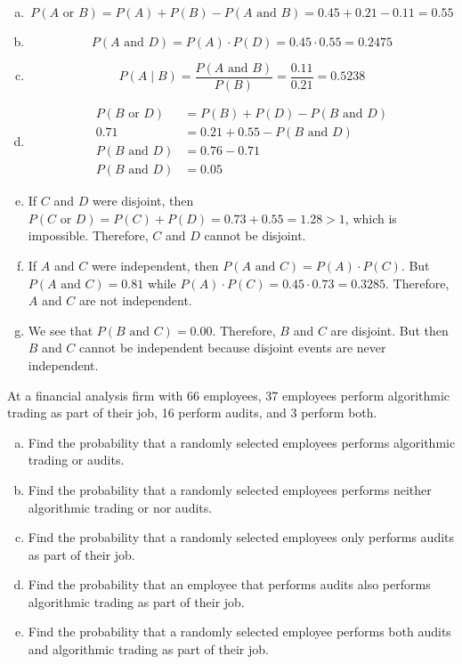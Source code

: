 \documentclass[11pt,letterpaper]{article}
\begin{document}
\sol
\begin{enumerate}[(a)]
\item 
	\[
	P(A \text{ or }B)= P(A) + P(B) - P(A \text{ and }B)= 0.45 + 0.21 - 0.11= 0.55
	\]

\item 
	\[
	P(A \text{ and }D)= P(A) \cdot P(D)= 0.45 \cdot 0.55= 0.2475
	\]

\item 
	\[
	P(A \;|\; B)= \dfrac{P(A \text{ and }B)}{P(B)}= \dfrac{0.11}{0.21}= 0.5238
	\]

\item 
	\[
	\begin{aligned}
	P(B \text{ or }D)&= P(B) + P(D) - P(B \text{ and }D) \\
	0.71&= 0.21 + 0.55 - P(B \text{ and }D) \\
	P(B \text{ and }D)&= 0.76 - 0.71 \\
	P(B \text{ and }D)&= 0.05
	\end{aligned}
	\]

\item If $C$ and $D$ were disjoint, then $P(C \text{ or }D)= P(C) + P(D)= 0.73 + 0.55= 1.28 > 1$, which is impossible. Therefore, $C$ and $D$ cannot be disjoint. 

\item If $A$ and $C$ were independent, then $P(A \text{ and }C)= P(A) \cdot P(C)$. But $P(A \text{ and }C)= 0.81$ while $P(A) \cdot P(C)= 0.45 \cdot 0.73= 0.3285$. Therefore, $A$ and $C$ are not independent. 

\item We see that $P(B \text{ and }C)= 0.00$. Therefore, $B$ and $C$ are disjoint. But then $B$ and $C$ cannot be independent because disjoint events are never independent. 
\end{enumerate}





\newpage





 At a financial analysis firm with 66 employees, 37 employees perform algorithmic trading as part of their job, 16 perform audits, and 3 perform both. 
        \begin{enumerate}[(a)]
        \item Find the probability that a randomly selected employees performs algorithmic trading or audits. 
        \item Find the probability that a randomly selected employees performs neither algorithmic trading or nor audits. 
        \item Find the probability that a randomly selected employees only performs audits as part of their job.
        \item Find the probability that an employee that performs audits also performs algorithmic trading as part of their job. 
        \item Find the probability that a randomly selected employee performs both audits and algorithmic trading as part of their job. 
        \end{enumerate} \pspace
\end{document}
